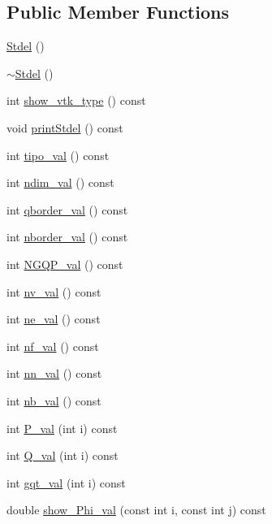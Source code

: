 \subsection*{Public Member Functions}
\begin{DoxyCompactItemize}
\item 
\hyperlink{classStdel_a6f8398df47bfe29fe96b89b604e0cd97}{Stdel} ()
\item 
\hyperlink{classStdel_adaf008b25928d7953a68572e1ab7f6ef}{$\sim$\+Stdel} ()
\item 
int \hyperlink{classStdel_a56288a857b95a55c8b7eb5b473e836d9}{show\+\_\+vtk\+\_\+type} () const
\item 
void \hyperlink{classStdel_a54b5768d09f500cb949e66fc234eac70}{print\+Stdel} () const
\item 
int \hyperlink{classStdel_a75023fc369db2752845a9ce278f10929}{tipo\+\_\+val} () const
\item 
int \hyperlink{classStdel_a383df930bee8dc298d7d412b3b632ebb}{ndim\+\_\+val} () const
\item 
int \hyperlink{classStdel_a457d20e34fb7a32eb1e4aca6c19f53a2}{qborder\+\_\+val} () const
\item 
int \hyperlink{classStdel_aac8e97661e46c48fafa91f13caa03a9f}{nborder\+\_\+val} () const
\item 
int \hyperlink{classStdel_a2f964819235e0a55fd60733518b592f2}{N\+G\+Q\+P\+\_\+val} () const
\item 
int \hyperlink{classStdel_ae2ab461d1bc8d9f6006665fe03684845}{nv\+\_\+val} () const
\item 
int \hyperlink{classStdel_aa45f211663f5e8e47fdea32232ff23ea}{ne\+\_\+val} () const
\item 
int \hyperlink{classStdel_a2eed3ce0b73050e868989be78d918e5c}{nf\+\_\+val} () const
\item 
int \hyperlink{classStdel_a6086dceed8fe3dd410da0d6b84f02377}{nn\+\_\+val} () const
\item 
int \hyperlink{classStdel_a4fb0a049dc27d8e67665a56d1b5a18ba}{nb\+\_\+val} () const
\item 
int \hyperlink{classStdel_a701c7d5595d4f6632333c4202898983b}{P\+\_\+val} (int i) const
\item 
int \hyperlink{classStdel_aeea4659f5bcabbf1acb374180c43a293}{Q\+\_\+val} (int i) const
\item 
int \hyperlink{classStdel_a0775d0c4f7f15ae26bd45fc949e6f6b9}{gqt\+\_\+val} (int i) const
\item 
double \hyperlink{classStdel_a6565c36150823a1f52a2daf05806f7a4}{show\+\_\+\+Phi\+\_\+val} (const int i, const int j) const

\end{DoxyCompactItemize}
